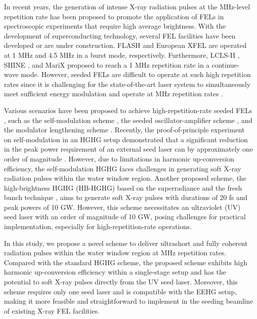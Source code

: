 \documentclass[%
 reprint,
 amsmath,amssymb,
 aps,
]{revtex4-2}
\begin{document}
In recent years, the generation of intense X-ray radiation pulses at the MHz-level repetition rate has been proposed to promote the application of FELs in spectroscopic experiments that require high average brightness. With the development of superconducting technology, several FEL facilities have been developed or are under construction. FLASH \citep{Ackermann2007} and European XFEL \citep{Decking2020} are operated at 1 MHz and 4.5 MHz in a burst mode, respectively. Furthermore, LCLS-II \citep{Stohr2011}, SHINE \citep{Huang2023,Liu2023}, and MariX \citep{SERAFINI2019} proposed to reach a 1 MHz repetition rate in a continue-wave mode. However, seeded FELs are difficult to operate at such high repetition rates since it is challenging for the state-of-the-art laser system to simultaneously meet sufficient energy modulation and operate at MHz repetition rates \citep{Hoeppner2015,Mecseki19}.

Various scenarios have been proposed to achieve high-repetition-rate seeded FELs \citep{Ackermann2020,Jia2021}, such as the self-modulation scheme \citep{Yan2021,yan20212,Paraskaki202100,zhao2022}, the seeded oscillator-amplifier scheme \cite{Paraskaki2021,Sun2022}, and the modulator lengthening scheme \citep{duning2011,Wang2022}. Recently, the proof-of-principle experiment on self-modulation in an HGHG setup demonstrated that a significant reduction in the peak power requirement of an external seed laser can by approximately one order of magnitude \citep{Yan2021,Yang2023}. However, due to limitations in harmonic up-conversion efficiency, the self-modulation HGHG faces challenges in generating soft X-ray radiation pulses within the water window region. Another proposed scheme, the high-brightness HGHG (HB-HGHG) \citep{Zhou2017} based on the superradiance \citep{Giannessi2005,Labat2009} and the fresh bunch technique \citep{Yu1997}, aims to generate soft X-ray pulses with durations of 20 fs and peak powers of 10 GW. However, this scheme necessitates an ultraviolet (UV) seed laser with an order of magnitude of 10 GW, posing challenges for practical implementation, especially for high-repetition-rate operations.

In this study, we propose a novel scheme to deliver ultrashort and fully coherent radiation pulses within the water window region at MHz repetition rates. Compared with the standard HGHG scheme, the proposed scheme exhibits high harmonic up-conversion efficiency within a single-stage setup and has the potential to soft X-ray pulses directly from the UV seed laser. Moreover, this scheme requires only one seed laser and is compatible with the EEHG setup, making it more feasible and straightforward to implement in the seeding beamline of existing X-ray FEL facilities.
\end{document}
